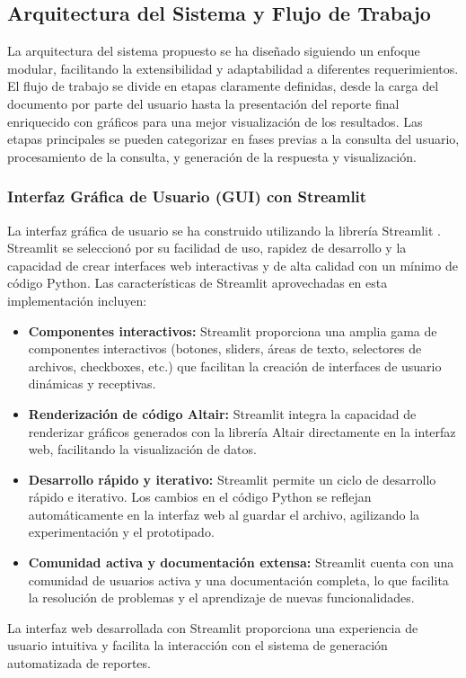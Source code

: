 \subsection{Arquitectura del Sistema y Flujo de Trabajo}

La arquitectura del sistema propuesto se ha diseñado siguiendo un enfoque modular, facilitando la extensibilidad y adaptabilidad a diferentes requerimientos. El flujo de trabajo se divide en etapas claramente definidas, desde la carga del documento por parte del usuario hasta la presentación del reporte final enriquecido con gráficos para una mejor visualización de los resultados. Las etapas principales se pueden categorizar en fases previas a la consulta del usuario, procesamiento de la consulta, y generación de la respuesta y visualización.

\subsubsection{Interfaz Gráfica de Usuario (GUI) con Streamlit}

La interfaz gráfica de usuario se ha construido utilizando la librería Streamlit \cite{streamlit}.  Streamlit se seleccionó por su facilidad de uso,  rapidez de desarrollo y la capacidad de crear interfaces web interactivas y de alta calidad con un mínimo de código Python.  Las características de Streamlit aprovechadas en esta implementación incluyen:

\begin{itemize}
	\item \textbf{Componentes interactivos:}  Streamlit proporciona una amplia gama de componentes interactivos (botones, sliders, áreas de texto, selectores de archivos, checkboxes, etc.) que facilitan la creación de interfaces de usuario dinámicas y receptivas.
	\item \textbf{Renderización de código Altair:}  Streamlit integra la capacidad de renderizar gráficos generados con la librería Altair directamente en la interfaz web,  facilitando la visualización de datos.
	\item \textbf{Desarrollo rápido y iterativo:}  Streamlit permite un ciclo de desarrollo rápido e iterativo.  Los cambios en el código Python se reflejan automáticamente en la interfaz web al guardar el archivo,  agilizando la experimentación y el prototipado.
	\item \textbf{Comunidad activa y documentación extensa:}  Streamlit cuenta con una comunidad de usuarios activa y una documentación completa,  lo que facilita la resolución de problemas y el aprendizaje de nuevas funcionalidades.
\end{itemize}
La interfaz web desarrollada con Streamlit proporciona una experiencia de usuario intuitiva y facilita la interacción con el sistema de generación automatizada de reportes.

